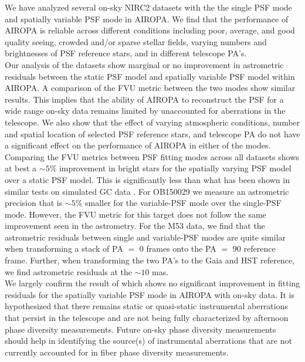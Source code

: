 \documentclass[]{spie}  %
\begin{document}
\indent We have analyzed several on-sky NIRC2 datasets with the the single PSF mode and spatially variable PSF mode in AIROPA. We find that the performance of AIROPA is reliable across different conditions including poor, average, and good quality seeing, crowded and/or sparse stellar fields, varying numbers and brightnesses of PSF reference stars, and in different telescope PA's.
\\
\indent Our analysis of the datasets show marginal or no improvement in astrometric residuals between the static PSF model and spatially variable PSF model within AIROPA. A comparison of the FVU metric between the two modes show similar results. This implies that the ability of AIROPA to reconstruct the PSF for a wide range on-sky data remains limited by unaccounted for aberrations in the telescope. We also show that the effect of varying atmospheric conditions, number and spatial location of selected PSF reference stars, and telescope PA do not have a significant effect on the performance of AIROPA in either of the modes.
\\
\indent Comparing the FVU metrics between PSF fitting modes across all datasets shows at best a ${\sim}5\%$ improvement in bright stars for the spatially varying PSF model over a static PSF model. This is significantly less than what has been shown in similar tests on simulated GC data \cite{Turri:inprep}. For OB150029 we measure an astrometric precision that is ${\sim}5\%$ smaller for the variable-PSF mode over the single-PSF mode. However, the FVU metric for this target does not follow the same improvement seen in the astrometry. For the M53 data, we find that the astrometric residuals between single and variable-PSF modes are quite similar when transforming a stack of PA $=$ 0 frames onto the PA $=$ 90 reference frame. Further, when transforming the two PA's to the Gaia and HST reference, we find astrometric residuals at the $\sim 10$ mas.
\\
\indent We largely confirm the result of \cite{Turri:inprep} which shows no significant improvement in fitting residuals for the spatially variable PSF mode in AIROPA with on-sky data. It is hypothesized that there remains static or quasi-static instrumental aberrations that persist in the telescope and are not being fully characterized by afternoon phase diversity measurements. Future on-sky phase diversity measurements should help in identifying the source(s) of instrumental aberrations that are not currently accounted for in fiber phase diversity measurements. 
\end{document}
